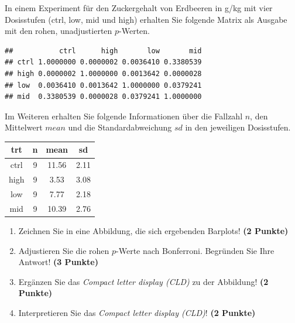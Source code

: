 \documentclass[a4paper, 10pt]{scrartcl}\usepackage[]{graphicx}\usepackage[]{xcolor}
\makeatletter
\newenvironment{kframe}{%
 \def\at@end@of@kframe{}%
 \ifinner\ifhmode%
  \def\at@end@of@kframe{\end{minipage}}%
  \begin{minipage}{\columnwidth}%
 \fi\fi%
 \def\FrameCommand##1{\hskip\@totalleftmargin \hskip-\fboxsep
 \colorbox{shadecolor}{##1}\hskip-\fboxsep
     \hskip-\linewidth \hskip-\@totalleftmargin \hskip\columnwidth}%
 \MakeFramed {\advance\hsize-\width
   \@totalleftmargin\z@ \linewidth\hsize
   \@setminipage}}%
 {\par\unskip\endMakeFramed%
 \at@end@of@kframe}
\newenvironment{knitrout}{}{} %
\makeatother
\begin{document}
 
 In einem Experiment f{\"u}r den Zuckergehalt von Erdbeeren in g/kg mit vier
 Dosisstufen (ctrl, low, mid und high) erhalten Sie folgende Matrix als
 \Rlogo Ausgabe mit den rohen, unadjustierten $p$-Werten.



\begin{knitrout}
\color{fgcolor}\begin{kframe}
\begin{verbatim}
##           ctrl      high       low       mid
## ctrl 1.0000000 0.0000002 0.0036410 0.3380539
## high 0.0000002 1.0000000 0.0013642 0.0000028
## low  0.0036410 0.0013642 1.0000000 0.0379241
## mid  0.3380539 0.0000028 0.0379241 1.0000000
\end{verbatim}
\end{kframe}
\end{knitrout}

Im Weiteren erhalten Sie folgende Informationen {\"u}ber die Fallzahl $n$, den
Mittelwert $mean$ und die Standardabweichung $sd$ in den jeweiligen Dosisstufen.

\begin{knitrout}
\color{fgcolor}\begin{table}[!h]
\centering
\begin{tabular}{cccc}
\toprule
trt & n & mean & sd\\
\midrule
ctrl & 9 & 11.56 & 2.11\\
high & 9 & 3.53 & 3.08\\
low & 9 & 7.77 & 2.18\\
mid & 9 & 10.39 & 2.76\\
\bottomrule
\end{tabular}
\end{table}

\end{knitrout}


\begin{enumerate}
\item Zeichnen Sie in eine Abbildung, die sich ergebenden Barplots! \textbf{(2 Punkte)}
\item Adjustieren Sie die rohen $p$-Werte nach Bonferroni. Begr{\"u}nden Sie Ihre Antwort! \textbf{(3 Punkte)}
\item Erg{\"a}nzen Sie das \textit{Compact letter display (CLD)} zu der
  Abbildung! \textbf{(2 Punkte)}
\item Interpretieren Sie das \textit{Compact letter display (CLD)}! \textbf{(2 Punkte)} 
\end{enumerate}
\end{document}
